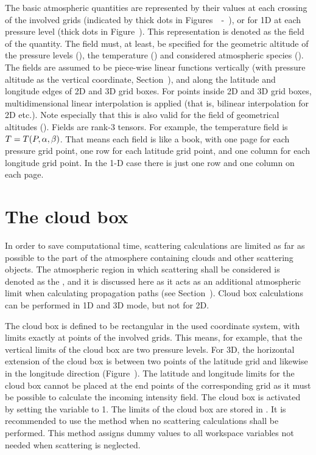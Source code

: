 The basic atmospheric quantities are represented by their values at
each crossing of the involved grids (indicated by thick dots in
Figures~~-~), or for 1D
at each pressure level (thick dots in Figure~).
This representation is denoted as the field
of the quantity. The field must, at least, be specified for the
geometric altitude of the pressure levels (), the
temperature () and considered atmospheric species
().  The fields are assumed to be piece-wise
linear functions vertically (with pressure altitude as the vertical
coordinate, Section~), and along the
latitude and longitude edges of 2D and 3D grid boxes. For points
inside 2D and 3D grid boxes, multidimensional linear interpolation is
applied (that is, bilinear interpolation for 2D etc.). Note especially
that this is also valid for the field of geometrical altitudes
(). Fields are rank-3 tensors. For example, the
temperature field is $T=T(P,\alpha,\beta)$. That means each field is
like a book, with one page for each pressure grid point, one row for
each latitude grid point, and one column for each longitude grid
point. In the 1-D case there is just one row and one column on each
page.



\section{The cloud box}

In order to save computational time, scattering calculations are
limited as far as possible to the part of the atmosphere containing
clouds and other scattering objects. The atmospheric region in which
scattering shall be considered is denoted as the , and it is discussed here as it acts as an additional
atmospheric limit when calculating propagation paths (see
Section~). Cloud box calculations can be
performed in 1D and 3D mode, but not for 2D.

The cloud box is defined to be rectangular in the used coordinate
system, with limits exactly at points of the involved grids. This
means, for example, that the vertical limits of the cloud box are two
pressure levels. For 3D, the horizontal extension of the cloud box
is between two points of the latitude grid and likewise in the
longitude direction (Figure~). The latitude
and longitude limits for the cloud box cannot be placed at the end
points of the corresponding grid as it must be possible to calculate
the incoming intensity field. The cloud box is activated by setting
the variable  to 1.  The limits of the cloud
box are stored in .  It is recommended to
use the method  when no scattering calculations
shall be performed. This method assigns dummy values to all workspace
variables not needed when scattering is neglected.

